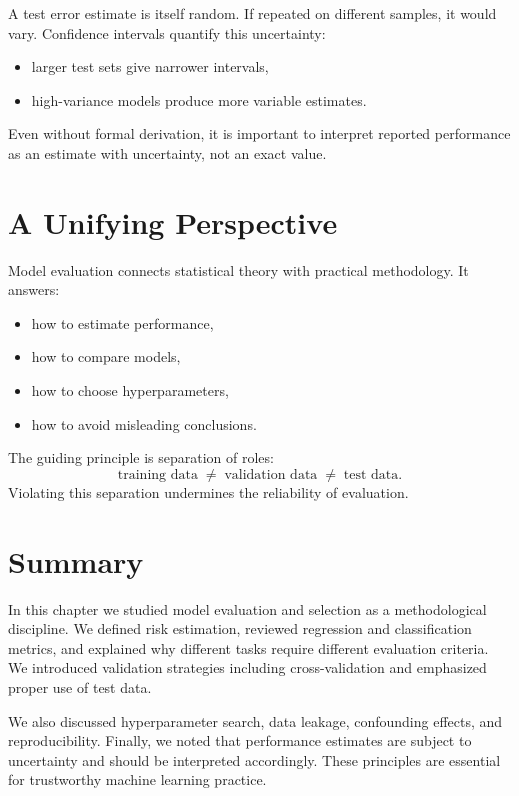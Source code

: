 A test error estimate is itself random. If repeated on different samples, it would vary. Confidence intervals quantify this uncertainty:
\begin{itemize}
    \item larger test sets give narrower intervals,
    \item high-variance models produce more variable estimates.
\end{itemize}

Even without formal derivation, it is important to interpret reported performance as an estimate with uncertainty, not an exact value.

\section{A Unifying Perspective}

Model evaluation connects statistical theory with practical methodology. It answers:
\begin{itemize}
    \item how to estimate performance,
    \item how to compare models,
    \item how to choose hyperparameters,
    \item how to avoid misleading conclusions.
\end{itemize}

The guiding principle is separation of roles:
\[
\text{training data} \;\neq\; \text{validation data} \;\neq\; \text{test data}.
\]
Violating this separation undermines the reliability of evaluation.

\section{Summary}

In this chapter we studied model evaluation and selection as a methodological discipline. We defined risk estimation, reviewed regression and classification metrics, and explained why different tasks require different evaluation criteria. We introduced validation strategies including cross-validation and emphasized proper use of test data.

We also discussed hyperparameter search, data leakage, confounding effects, and reproducibility. Finally, we noted that performance estimates are subject to uncertainty and should be interpreted accordingly. These principles are essential for trustworthy machine learning practice.